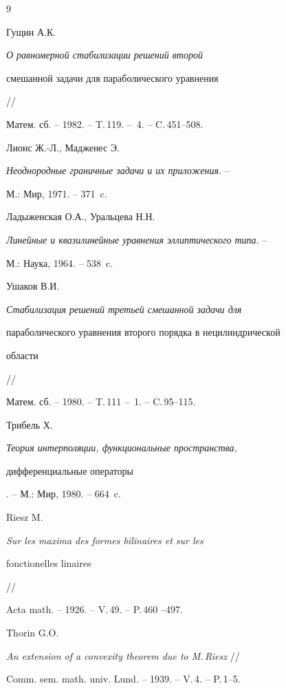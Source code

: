 \begin{thebibliography}{9}







Гущин А.К. {\em О равномерной стабилизации решений второй 


смешанной задачи для параболического уравнения} // 


Матем. сб. -- 1982. -- T.\,119. -- \No\,4. -- C.\,451--508.




Лионс Ж.-Л., Мадженес Э. 


{\em Неоднородные граничные задачи и их приложения}. --


М.: Мир, 1971. -- 371~c.




Ладыженская О.А., Уральцева Н.Н.


{\em Линейные и квазилинейные уравнения эллиптического типа}. --


М.: Наука, 1964. -- 538~c.




Ушаков В.И.


{\em Стабилизация решений третьей смешанной задачи для


параболического уравнения второго порядка в нецилиндрической


области} // 


Матем. сб. -- 1980. -- T.\,111 -- \No\,1. -- C.\,95--115.




Трибель Х. {\em Теория интерполяции, функциональные пространства,


дифференциальные операторы}. -- М.: Мир, 1980. -- 664~c.




Riesz M. {\em  Sur les maxima des formes bilinaires et sur les


fonctionelles linaires} // 


Acta math. -- 1926. -- V.\,49. -- P.\,460 --497.




Thorin G.O.


{\em An extension of a convexity theorem due to M.\,Riesz} //


Comm. sem. math. univ. Lund. -- 1939. -- V.\,4. -- P.\,1--5.


 


\end{thebibliography}





\vskip 2cm











\label{end}






